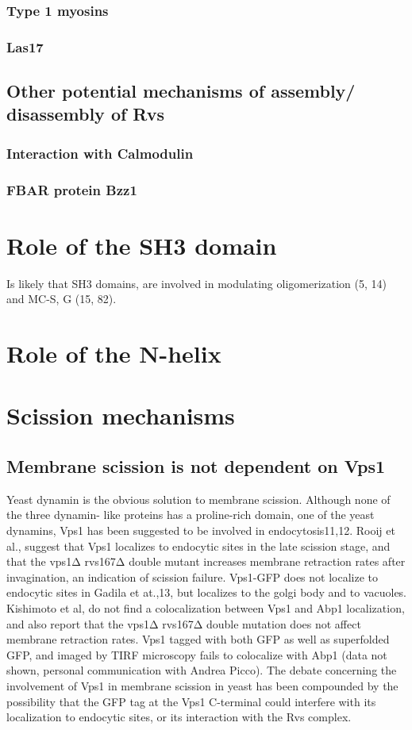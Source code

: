 		\subsubsection{Type 1 myosins}
		\subsubsection{Las17}


	\subsection{Other potential mechanisms of assembly/ disassembly of Rvs}		
			\subsubsection{Interaction with Calmodulin}
			\subsubsection{FBAR protein Bzz1}
				
\section{Role of the SH3 domain}	
Is likely that SH3 domains, are involved in modulating oligomerization (5, 14) and MC-S, G (15, 82). 	
\section{Role of the N-helix}			
		
\section{Scission mechanisms}

	\subsection{Membrane scission is not dependent on Vps1}
	Yeast dynamin is the obvious solution to membrane scission. Although none of the three dynamin- like proteins has a proline-rich domain, one of the yeast dynamins, Vps1 has been suggested to be involved in endocytosis11,12. Rooij et al., suggest that Vps1 localizes to endocytic sites in the late scission stage, and that the vps1Δ rvs167Δ double mutant increases membrane retraction rates after invagination, an indication of scission failure. Vps1-GFP does not localize to endocytic sites in Gadila et at.,13, but localizes to the golgi body and to vacuoles. Kishimoto et al, do not find a colocalization between Vps1 and Abp1 localization, and also report that the vps1Δ rvs167Δ  double mutation does not affect membrane retraction rates. Vps1 tagged with both GFP as well as superfolded GFP, and imaged by TIRF microscopy fails to colocalize with Abp1 (data not shown, personal communication with Andrea Picco). The debate concerning the involvement of Vps1 in membrane scission in yeast has been compounded by the possibility that the GFP tag at the Vps1 C-terminal could interfere with its localization to endocytic sites, or its interaction with the Rvs complex. 
	
